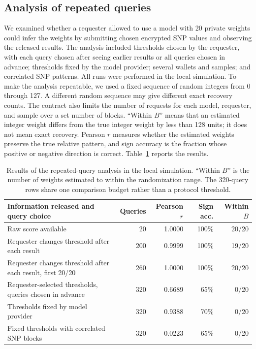 \documentclass[10pt]{article}
\begin{document}
\subsection{Analysis of repeated queries}

We examined whether a requester allowed to use a model with 20 private weights could
infer the weights by submitting chosen encrypted SNP values and observing the released
results.  The analysis included thresholds chosen by the requester, with each query
chosen after seeing earlier results or all queries chosen in advance; thresholds fixed
by the model provider; several wallets and samples; and correlated SNP patterns.  All
runs were performed in the local simulation.  To make the analysis repeatable,
we used a fixed sequence of random integers from 0 through 127. A different
random sequence may give different exact recovery counts. The contract also limits the
number of requests for each model, requester, and sample over a set number of blocks.
``Within $B$'' means that an estimated integer weight differs from the true integer weight
by less than 128 units; it does not mean exact recovery.  Pearson $r$ measures whether the
estimated weights preserve the true relative pattern, and sign accuracy is the fraction
whose positive or negative direction is correct.  Table~\ref{tab:probing} reports the
results.

\begin{table}[t]
\centering
\caption{Results of the repeated-query analysis in the local simulation. ``Within
$B$'' is the number of weights estimated to within the randomization range. The
320-query rows share one comparison budget rather than a protocol threshold.}
\label{tab:probing}
\small
\begin{tabularx}{\textwidth}{@{}Xrrrr@{}}
\toprule
\textbf{Information released and query choice} & \textbf{Queries} & \textbf{Pearson $r$} & \textbf{Sign acc.} & \textbf{Within $B$} \\
\midrule
Raw score available & 20 & 1.0000 & 100\% & 20/20 \\
Requester changes threshold after each result & 200 & 0.9999 & 100\% & 19/20 \\
Requester changes threshold after each result, first 20/20 & 260 & 1.0000 & 100\% & 20/20 \\
Requester-selected thresholds, queries chosen in advance & 320 & 0.6689 & 65\% & 0/20 \\
Thresholds fixed by model provider & 320 & 0.9388 & 70\% & 0/20 \\
Fixed thresholds with correlated SNP blocks & 320 & 0.0223 & 65\% & 0/20 \\
\bottomrule
\end{tabularx}
\end{table}
\end{document}
